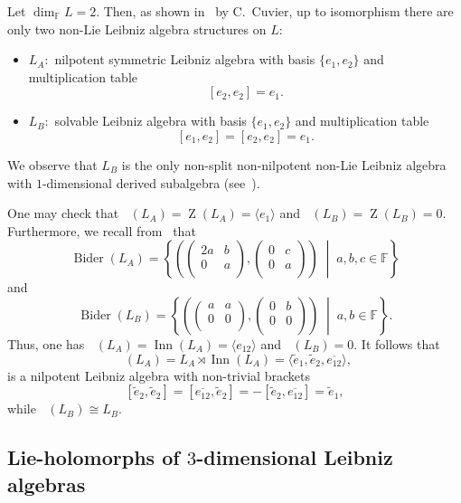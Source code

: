 \documentclass[11pt,a4paper]{amsart}
\theoremstyle{plain}
\theoremstyle{definition}
\theoremstyle{remark}
\numberwithin{equation}{section}
\newcommand{\0}{\emptyset}
\newcommand{\bF}{\mathbb{F}}
\DeclareMathOperator{\DerL}{Der_{Lie}}
\DeclareMathOperator{\Bider}{Bider}
\DeclareMathOperator{\Inn}{Inn}
\DeclareMathOperator{\Z}{Z}
\DeclareMathOperator{\ZL}{Z_{Lie}}
\DeclareMathOperator{\holL}{hol_{Lie}}
\newcommand{\ov}[1]{\overline{#1}}
\begin{document}
Let $\dim_\bF L=2$. Then, as shown in~\cite{2-dimCuvier} by C.~Cuvier, up to isomorphism there are only two non-Lie Leibniz algebra structures on $L$:

\begin{itemize}
\item $L_A$:~nilpotent symmetric Leibniz algebra with basis $\lbrace e_1,e_2 \rbrace$ and multiplication table 
\[
[e_2,e_2]=e_1.
\]
\item $L_B$:~solvable Leibniz algebra with basis $\lbrace e_1,e_2 \rbrace$ and multiplication table
\[
[e_1,e_2]=[e_2,e_2]=e_1.
\]
\end{itemize}

We observe that $L_B$ is the only non-split non-nilpotent non-Lie Leibniz algebra with $1$-dimensional derived subalgebra (see~\cite[Corollary 2.3]{LaRosaManciniDiBartolo}).

One may check that $\ZL(L_A)=\Z(L_A)=\langle e_1 \rangle$ and $\ZL(L_B)=\Z(L_B)=0$. Furthermore, we recall from~\cite[Section 4.1]{ManciniBider} that 
\[
\Bider(L_A)=\left\lbrace \left( \begin{pmatrix}
2a & b \\
0 & a \\
\end{pmatrix},\begin{pmatrix}
0 & c \\
0 & a \\
\end{pmatrix} \right) \; \middle| \; a,b,c \in \bF \right\rbrace
\]
and
\[
\Bider(L_B)=\left\lbrace \left( \begin{pmatrix}
a & a \\
0 & 0 \\
\end{pmatrix},\begin{pmatrix}
0 & b \\
0 & 0 \\
\end{pmatrix} \right) \; \middle| \; a,b \in \bF \right\rbrace.
\]
Thus, one has $\DerL(L_A)=\Inn(L_A)=\langle e_{12} \rangle$ and $\DerL(L_B)=0$. It follows that
\[
\holL(L_A)=L_A \rtimes \Inn(L_A)=\langle \widetilde{e}_1,\widetilde{e}_2,\ov{e_{12}} \rangle,
\]
is a nilpotent Leibniz algebra with non-trivial brackets
\[
[\widetilde{e}_2,\widetilde{e}_2]=[\ov{e_{12}},\widetilde{e}_2]=-[\widetilde{e}_2,\ov{e_{12}}]=\widetilde{e}_1,
\]
while $\holL(L_B) \cong L_B$.

\subsection{Lie-holomorphs of $3$-dimensional Leibniz algebras}
\end{document}

